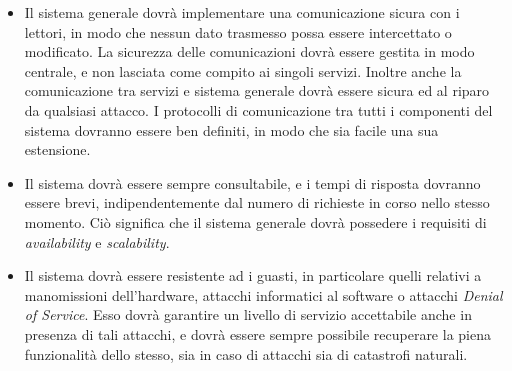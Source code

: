 \documentclass[a4paper,12pt]{report}
\begin{document}
\begin{itemize}
	\item Il sistema generale dovrà implementare una comunicazione sicura con i lettori, in modo che nessun dato trasmesso possa essere intercettato o modificato. La sicurezza delle comunicazioni dovrà essere gestita in modo centrale, e non lasciata come compito ai singoli servizi. Inoltre anche la comunicazione tra servizi e sistema generale dovrà essere sicura ed al riparo da qualsiasi attacco. I protocolli di comunicazione tra tutti i componenti del sistema dovranno essere ben definiti, in modo che sia facile una sua estensione. 
	\item Il sistema dovrà essere sempre consultabile, e i tempi di risposta dovranno essere brevi, indipendentemente dal numero di richieste in corso nello stesso momento. Ciò significa che il sistema generale dovrà possedere i requisiti di \emph{availability} e \emph{scalability}.
	\item Il sistema dovrà essere resistente ad i guasti, in particolare quelli relativi a manomissioni dell'hardware, attacchi informatici al software o attacchi \emph{Denial of Service}. Esso dovrà garantire un livello di servizio accettabile anche in presenza di tali attacchi, e dovrà essere sempre possibile recuperare la piena funzionalità dello stesso, sia in caso di attacchi sia di catastrofi naturali. 
\end{itemize}
\end{document}
